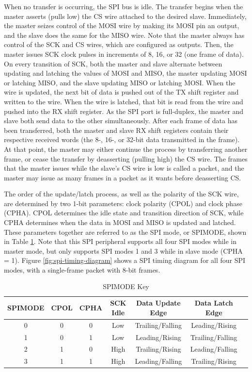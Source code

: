 When no transfer is occurring, the SPI bus is idle. The transfer begins when the master asserts (pulls low) the CS wire attached to the desired slave. Immediately, the master seizes control of the MOSI wire by making its MOSI pin an output, and the slave does the same for the MISO wire. Note that the master always has control of the SCK and CS wires, which are configured as outputs. Then, the master issues SCK clock pulses in increments of 8, 16, or 32 (one frame of data). On every transition of SCK, both the master and slave alternate between updating and latching the values of MOSI and MISO, the master updating MOSI or latching MISO, and the slave updating MISO or latching MOSI. When the wire is updated, the next bit of data is pushed out of the TX shift register and written to the wire. When the wire is latched, that bit is read from the wire and pushed into the RX shift register. As the SPI port is full-duplex, the master and slave both send data to the other simultaneously. After each frame of data has been transferred, both the master and slave RX shift registers contain their respective received words (the 8-, 16-, or 32-bit data transmitted in the frame). At that point, the master may either continue the process by transferring another frame, or cease the transfer by deasserting (pulling high) the CS wire. The frames that the master issues while the slave's CS wire is low is called a packet, and the master may issue as many frames in a packet as it wants before deasserting CS.

The order of the update/latch process, as well as the polarity of the SCK wire, are determined by two 1-bit parameters: clock polarity (CPOL) and clock phase (CPHA). CPOL determines the idle state and transition direction of SCK, while CPHA determines when the data in MOSI and MISO is updated and latched. These parameters together are referred to as the SPI mode, or SPIMODE, shown in Table \ref{t:SPIMODE-key}. Note that this SPI peripheral supports all four SPI modes while in master mode, but only supports SPI modes 1 and 3 while in slave mode (CPHA = 1). Figure \ref{fig:spi-timing-diagram} shows a SPI timing diagram for all four SPI modes, with a single-frame packet with 8-bit frames.

\begin{table}[htb]
	\centering
	\begin{tabular}{ c c c c c c c }
	\caption{SPIMODE Key} \label{t:SPIMODE-key}
	\textbf{SPIMODE} & \textbf{CPOL} & \textbf{CPHA} & \textbf{SCK Idle} & \textbf{Data Update Edge} & \textbf{Data Latch Edge} \\ \hline
	0 & 0 & 0 & Low  & Trailing/Falling & Leading/Rising \\
	\rowcolor{tablehighlightcolor}
	1 & 0 & 1 & Low  & Leading/Rising & Trailing/Falling \\
	2 & 1 & 0 & High  & Trailing/Rising & Leading/Falling \\
	\rowcolor{tablehighlightcolor}
	3 & 1 & 1 & High  & Leading/Falling & Trailing/Rising \\
	\hline
	\end{tabular}
\end{table}

